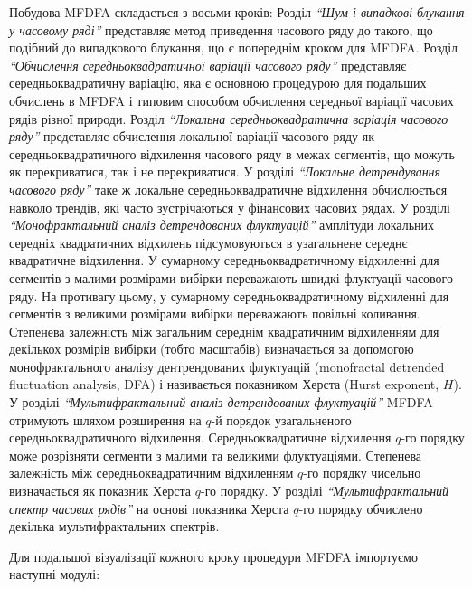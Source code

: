 \documentclass[
  letterpaper,
]{report}
\begin{document}
Побудова MFDFA складається з восьми кроків: Розділ \emph{``Шум і
випадкові блукання у часовому ряді''} представляє метод приведення
часового ряду до такого, що подібний до випадкового блукання, що є
попереднім кроком для MFDFA. Розділ \emph{``Обчислення
середньоквадратичної варіації часового ряду''} представляє
середньоквадратичну варіацію, яка є основною процедурою для подальших
обчислень в MFDFA і типовим способом обчислення середньої варіації
часових рядів різної природи. Розділ \emph{``Локальна
середньоквадратична варіація часового ряду''} представляє обчислення
локальної варіації часового ряду як середньоквадратичного відхилення
часового ряду в межах сегментів, що можуть як перекриватися, так і не
перекриватися. У розділі \emph{``Локальне детрендування часового ряду''}
таке ж локальне середньоквадратичне відхилення обчислюється навколо
трендів, які часто зустрічаються у фінансових часових рядах. У розділі
\emph{``Монофрактальний аналіз детрендованих флуктуацій''} амплітуди
локальних середніх квадратичних відхилень підсумовуються в узагальнене
середнє квадратичне відхилення. У сумарному середньоквадратичному
відхиленні для сегментів з малими розмірами вибірки переважають швидкі
флуктуації часового ряду. На противагу цьому, у сумарному
середньоквадратичному відхиленні для сегментів з великими розмірами
вибірки переважають повільні коливання. Степенева залежність між
загальним середнім квадратичним відхиленням для декількох розмірів
вибірки (тобто масштабів) визначається за допомогою монофрактального
аналізу дентрендованих флуктуацій (monofractal detrended fluctuation
analysis, DFA) і називається показником Херста (Hurst exponent, \(H\)).
У розділі \emph{``Мультифрактальний аналіз детрендованих флуктуацій''}
MFDFA отримують шляхом розширення на \(q\)-й порядок узагальненого
середньоквадратичного відхилення. Середньоквадратичне відхилення
\(q\)-го порядку може розрізняти сегменти з малими та великими
флуктуаціями. Степенева залежність між середньоквадратичним відхиленням
\(q\)-го порядку чисельно визначається як показник Херста \(q\)-го
порядку. У розділі \emph{``Мультифрактальний спектр часових рядів''} на
основі показника Херста \(q\)-го порядку обчислено декілька
мультифрактальних спектрів.

Для подальшої візуалізації кожного кроку процедури MFDFA імпортуємо
наступні модулі:
\end{document}
